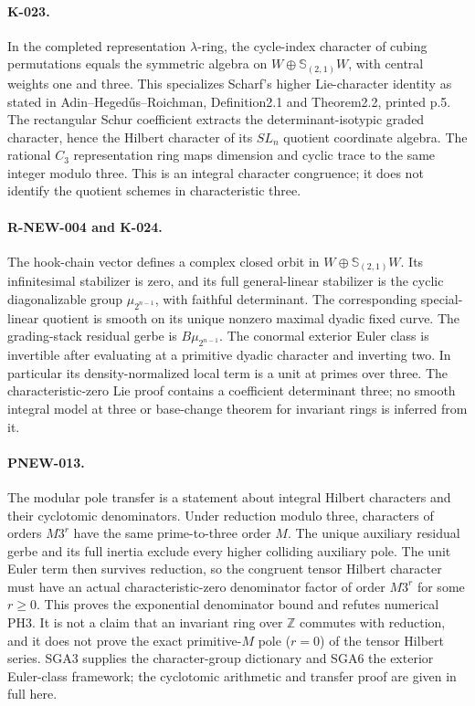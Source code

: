 \paragraph{K-023.}
In the completed representation $\lambda$-ring, the cycle-index
character of cubing permutations equals the symmetric algebra
on $W\oplus\mathbb S_{(2,1)}W$, with central weights one and
three. This specializes Scharf's higher Lie-character identity
as stated in Adin--Heged\H us--Roichman, Definition2.1 and
Theorem2.2, printed p.5. The rectangular Schur coefficient extracts
the determinant-isotypic graded character, hence the Hilbert
character of its $SL_n$ quotient coordinate algebra. The rational
$C_3$ representation ring
maps dimension and cyclic trace to the same integer modulo
three. This is an integral character congruence; it does not
identify the quotient schemes in characteristic three.

\paragraph{R-NEW-004 and K-024.}
The hook-chain vector defines a complex closed orbit in
$W\oplus\mathbb S_{(2,1)}W$. Its infinitesimal stabilizer is
zero, and its full general-linear stabilizer is the cyclic
diagonalizable group $\mu_{2^{n-1}}$, with faithful determinant.
The corresponding special-linear quotient is smooth on its
unique nonzero maximal dyadic fixed curve. The grading-stack
residual gerbe is $B\mu_{2^{n-1}}$. The conormal exterior
Euler class is invertible after evaluating at a primitive
dyadic character and inverting two. In particular its
density-normalized local term is a unit at primes over three.
The characteristic-zero Lie proof contains a coefficient
determinant three; no smooth integral model at three or
base-change theorem for invariant rings is inferred from it.

\paragraph{PNEW-013.}
The modular pole transfer is a statement about integral
Hilbert characters and their cyclotomic denominators. Under
reduction modulo three, characters of orders $M3^r$ have the
same prime-to-three order $M$. The unique auxiliary residual
gerbe and its full inertia exclude every higher colliding
auxiliary pole. The unit Euler term then survives reduction,
so the congruent tensor Hilbert character must have an actual
characteristic-zero denominator factor of order $M3^r$ for
some $r\ge0$. This proves the exponential denominator bound
and refutes numerical PH3. It is not a claim that an invariant
ring over $\mathbb Z$ commutes with reduction, and it does
not prove the exact primitive-$M$ pole ($r=0$) of the tensor
Hilbert series. SGA3 supplies the character-group dictionary and
SGA6 the exterior Euler-class framework; the cyclotomic
arithmetic and transfer proof are given in full here.

